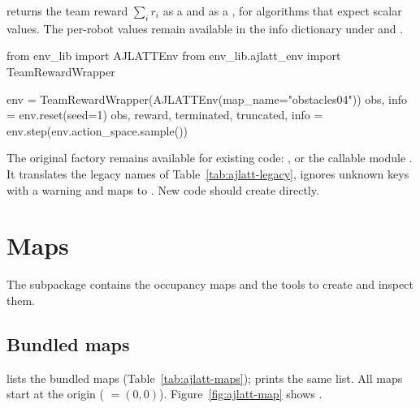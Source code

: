  returns the team reward $\sum_i r_i$ as a
 and  as a , for algorithms that
expect scalar values. The per-robot values remain available in the info
dictionary under  and .

\begin{pycode}
from env_lib import AJLATTEnv
from env_lib.ajlatt_env import TeamRewardWrapper

env = TeamRewardWrapper(AJLATTEnv(map_name="obstacles04"))
obs, info = env.reset(seed=1)
obs, reward, terminated, truncated, info = env.step(env.action_space.sample())
\end{pycode}

The original factory remains available for existing code:
, or the callable module
. It translates the legacy
names of Table~\ref{tab:ajlatt-legacy}, ignores unknown keys with a warning and
maps  to . New code should create
 directly.

\section{Maps}\label{sec:ajlatt-maps}

The subpackage  contains the occupancy maps and
the tools to create and inspect them.

\subsection{Bundled maps}\label{sec:ajlatt-bundled-maps}

 lists the bundled maps (Table~\ref{tab:ajlatt-maps});
 prints the same list. All maps start at the
origin ( $= (0, 0)$). Figure~\ref{fig:ajlatt-map} shows
.

